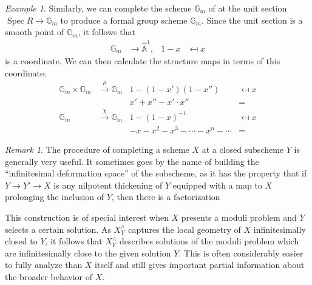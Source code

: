 \documentclass{amsart}
\newcommand{\G}{\mathbb G}
\newcommand{\A}{\widehat{\mathbb{A}}}
\newcommand{\<}{\langle}
\renewcommand{\>}{\rangle}
\DeclareMathOperator{\Spec}{Spec}
\theoremstyle{plain}
\theoremstyle{definition}
\theoremstyle{remark}
\newtheorem*{remark}{Remark}
\newtheorem*{example}{Example}
\begin{document}
\begin{example}
Similarly, we can complete the scheme $\mathbb G_m$ of  at the unit section $\Spec R \to \mathbb G_m$ to produce a formal group scheme $\G_m$.  Since the unit section is a smooth point of $\mathbb G_m$, it follows that
\begin{align*}
\G_m & \to \A^1, & 1-x & \mapsfrom x
\end{align*}
is a coordinate.  We can then calculate the structure maps in terms of this coordinate:
\begin{align*}
\G_m \times \G_m & \xrightarrow{\mu} \G_m & 1 - (1 - x')(1 - x'') & \mapsfrom x \\
& & x' + x'' - x' \cdot x'' & = \\
\G_m & \xrightarrow{\chi} \G_m & 1 - (1 - x)^{-1} & \mapsfrom x \\
& & -x -x^2 -x^3 - \cdots - x^n - \cdots & = 
\end{align*}
\end{example}

\begin{remark}\label{WhyDeformationTheory}
The procedure of completing a scheme $X$ at a closed subscheme $Y$ is generally very useful.  It sometimes goes by the name of building the ``infinitesimal deformation space'' of the subscheme, as it has the property that if $Y \to Y' \to X$ is any nilpotent thickening of $Y$ equipped with a map to $X$ prolonging the inclusion of $Y$, then there is a factorization
\begin{center}
\end{center}
This construction is of special interest when $X$ presents a moduli problem and $Y$ selects a certain solution.  As $X^\wedge_Y$ captures the local geometry of $X$ infinitesimally closed to $Y$, it follows that $X^\wedge_Y$ describes solutions of the moduli problem which are infinitesimally close to the given solution $Y$.  This is often considerably easier to fully analyze than $X$ itself and still gives important partial information about the broader behavior of $X$.
\end{remark}
\end{document}
